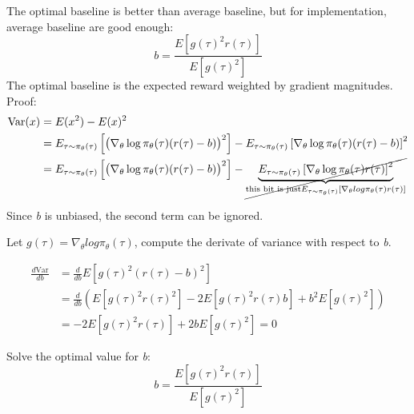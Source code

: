 \documentclass[]{article}
\begin{document}
\par 
The optimal baseline is better than average baseline, but for implementation, average baseline are good enough: 
\begin{equation}b=\frac{E\left[g(\tau)^{2} r(\tau)\right]}{E\left[g(\tau)^{2}\right]}\end{equation}
The optimal baseline is the expected reward weighted by gradient magnitudes.
Proof: 
\begin{align*}
\text{Var}(x) &= E(x^2) - E(x)^2 \\
&= E _ { \tau \sim \pi _ { \theta } ( \tau ) } \left[ \big( \nabla _ { \theta } \log \pi _ { \theta } ( \tau ) ( r ( \tau ) - b ) \big) ^ { 2 } \right] - E _ { \tau \sim \pi _ { \theta } ( \tau ) } \left[ \nabla _ { \theta } \log \pi _ { \theta } ( \tau ) ( r ( \tau ) - b ) \right] ^ { 2 } \\
&= E _ { \tau \sim \pi _ { \theta } ( \tau ) } \left[ \big( \nabla _ { \theta } \log \pi _ { \theta } ( \tau ) ( r (
\tau ) - b ) \big) ^ { 2 } \right] - \cancel{\underbrace{E _ { \tau \sim \pi _ { \theta } ( \tau ) } \left[ \nabla _ { \theta } \log
\pi _ { \theta } ( \tau ) r ( \tau ) \right] ^ { 2 }}_{\text{this bit is just} E_{\tau \sim
\pi_{\theta}(\tau)}[\nabla_{\theta}log\pi_{\theta}(\tau)r(\tau)]}}
\end{align*}

Since \textit{b} is unbiased, the second term can be ignored. 
\par Let $g(\tau) = \nabla_{\theta}log\pi_{\theta}(\tau)$, compute the derivate of variance
with respect to \textit{b}.

\begin{align*}
\frac { d \text{Var} } { d b } &= \frac { d } { d b } E \left[ g ( \tau ) ^ { 2 } ( r ( \tau ) - b ) ^ { 2 } \right] \\
& = \frac { d } { d b } \left( E \left[ g ( \tau ) ^ { 2 } r ( \tau ) ^ { 2 } \right] - 2 E \left[ g ( \tau ) ^ { 2 } r ( \tau ) b \right] + b ^ { 2 } E \left[ g ( \tau ) ^ { 2 } \right] \right) \\
& = - 2 E \left[ g ( \tau ) ^ { 2 } r ( \tau ) \right] + 2 b E \left[ g ( \tau ) ^ { 2 } \right] = 0
\end{align*}

\par Solve the optimal value for \textit{b}:
\begin{equation}b=\frac{E\left[g(\tau)^{2} r(\tau)\right]}{E\left[g(\tau)^{2}\right]}\end{equation}
\end{document}
